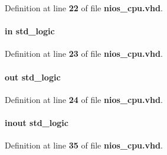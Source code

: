 Definition at line {\bf 22} of file {\bf nios\+\_\+cpu.\+vhd}.

\paragraph[{exfifo\+\_\+of\+\_\+wrfull}]{ {\bfseries \textcolor{keywordflow}{in}\textcolor{vhdlchar}{ }} {\bfseries \textcolor{comment}{std\+\_\+logic}\textcolor{vhdlchar}{ }} \hspace{0.3cm}{\ttfamily [Port]}}\label{classnios__cpu_a57170ed088dec87cbd51b615ff8de5d6}


Definition at line {\bf 23} of file {\bf nios\+\_\+cpu.\+vhd}.

\paragraph[{exfifo\+\_\+rst}]{ {\bfseries \textcolor{keywordflow}{out}\textcolor{vhdlchar}{ }} {\bfseries \textcolor{comment}{std\+\_\+logic}\textcolor{vhdlchar}{ }} \hspace{0.3cm}{\ttfamily [Port]}}\label{classnios__cpu_a9a3b798438b2473d47330ac922f0206f}


Definition at line {\bf 24} of file {\bf nios\+\_\+cpu.\+vhd}.

\paragraph[{i2c\+\_\+scl}]{ {\bfseries \textcolor{keywordflow}{inout}\textcolor{vhdlchar}{ }} {\bfseries \textcolor{comment}{std\+\_\+logic}\textcolor{vhdlchar}{ }} \hspace{0.3cm}{\ttfamily [Port]}}\label{classnios__cpu_a7c195566ec97d61478bf3947b2643c70}


Definition at line {\bf 35} of file {\bf nios\+\_\+cpu.\+vhd}.


